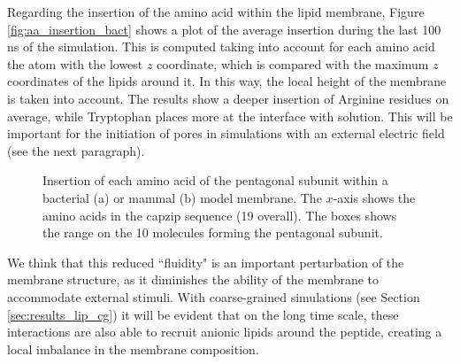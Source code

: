 Regarding the insertion of the amino acid within the lipid membrane, Figure \ref{fig:aa_insertion_bact} shows a plot of the average insertion during the last 100 ns of the simulation. This is computed taking into account for each amino acid the atom with the lowest $z$ coordinate, which is compared with the maximum $z$ coordinates of the lipids around it. In this way, the local height of the membrane is taken into account. The results show a deeper insertion of Arginine residues on average, while Tryptophan places more at the interface with solution. This will be important for the initiation of pores in simulations with an external electric field (see the next paragraph).
%
\begin{figure}[t!]
\centering
{}
\caption[Insertion of capzip amino acid in model membranes]{Insertion of each amino acid of the pentagonal subunit within a bacterial (a) or mammal (b) model membrane. The $x$-axis shows the amino acids in the capzip sequence (19 overall). The boxes shows the range on the 10 molecules forming the pentagonal subunit.}
\label{fig:aa_insertion}
\end{figure}

We think that this reduced ``fluidity" is an important perturbation of the membrane structure, as it diminishes the ability of the membrane to accommodate external stimuli. With coarse-grained simulations (see Section \ref{sec:results_lip_cg}) it will be evident that on the long time scale, these interactions are also able to recruit anionic lipids around the peptide, creating a local imbalance in the membrane composition.


